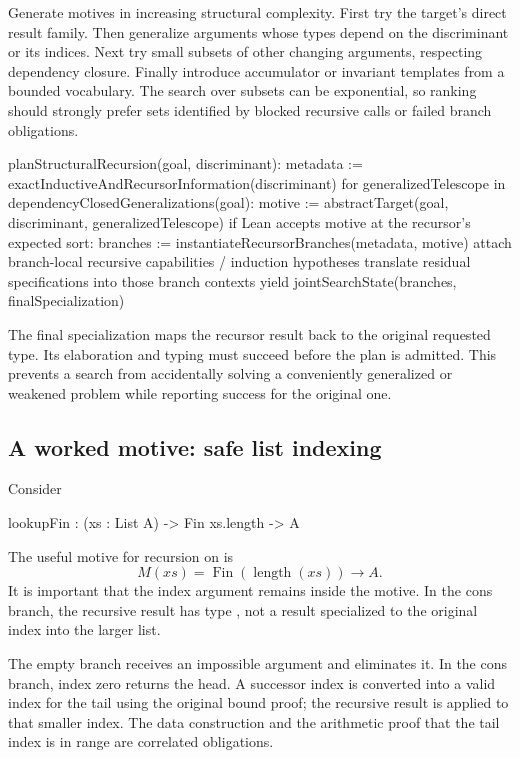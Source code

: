 \documentclass[11pt,letterpaper]{article}
\newcommand{\id}[1]{\texttt{\detokenize{#1}}}
\theoremstyle{definition}
\theoremstyle{remark}
\begin{document}
Generate motives in increasing structural complexity. First try the target's direct result family. Then generalize arguments whose types depend on the discriminant or its indices. Next try small subsets of other changing arguments, respecting dependency closure. Finally introduce accumulator or invariant templates from a bounded vocabulary. The search over subsets can be exponential, so ranking should strongly prefer sets identified by blocked recursive calls or failed branch obligations.

\begin{code}
planStructuralRecursion(goal, discriminant):
    metadata := exactInductiveAndRecursorInformation(discriminant)
    for generalizedTelescope in dependencyClosedGeneralizations(goal):
        motive := abstractTarget(goal, discriminant, generalizedTelescope)
        if Lean accepts motive at the recursor's expected sort:
            branches := instantiateRecursorBranches(metadata, motive)
            attach branch-local recursive capabilities / induction hypotheses
            translate residual specifications into those branch contexts
            yield jointSearchState(branches, finalSpecialization)
\end{code}

The final specialization maps the recursor result back to the original requested type. Its elaboration and typing must succeed before the plan is admitted. This prevents a search from accidentally solving a conveniently generalized or weakened problem while reporting success for the original one.

\subsection{A worked motive: safe list indexing}

Consider
\begin{code}
lookupFin : (xs : List A) -> Fin xs.length -> A
\end{code}
The useful motive for recursion on \id{xs} is
\[
 M(xs)=\operatorname{Fin}(\operatorname{length}(xs))\to A.
\]
It is important that the index argument remains inside the motive. In the cons branch, the recursive result has type \id{Fin xs.length → A}, not a result specialized to the original index into the larger list.

The empty branch receives an impossible \id{Fin 0} argument and eliminates it. In the cons branch, index zero returns the head. A successor index is converted into a valid index for the tail using the original bound proof; the recursive result is applied to that smaller index. The data construction and the arithmetic proof that the tail index is in range are correlated obligations.
\end{document}

